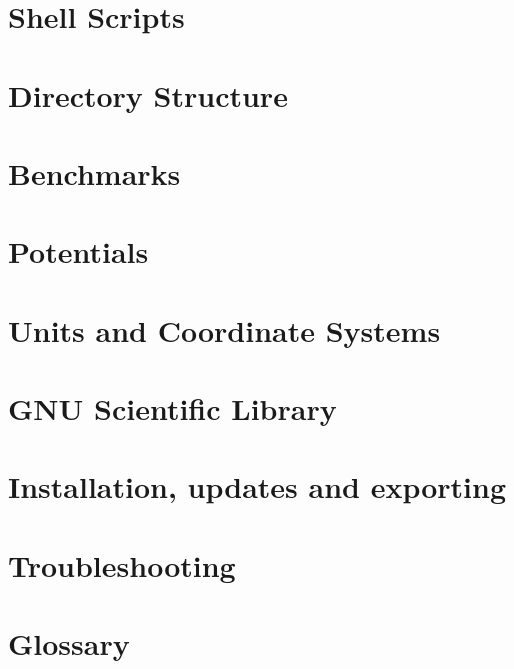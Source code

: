 \chapter                {Shell Scripts}
 
\cleardoublepage
\chapter                {Directory Structure}
 
\cleardoublepage
\chapter                {Benchmarks}
 
\cleardoublepage
\chapter                {Potentials}
 
\cleardoublepage
\chapter                {Units and Coordinate Systems}
 
\cleardoublepage
\chapter                {GNU Scientific Library}
 
\cleardoublepage
\chapter                {Installation, updates and exporting}
 
\cleardoublepage
\chapter                {Troubleshooting}
 
\cleardoublepage
\chapter                {Glossary}
 
\cleardoublepage
